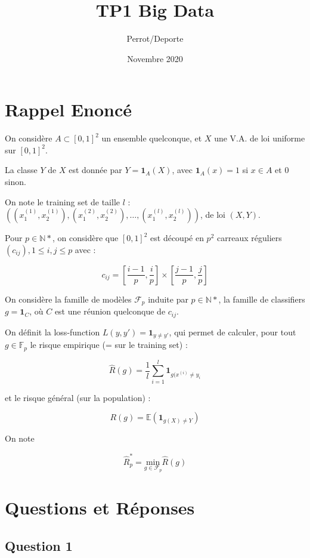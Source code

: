 \documentclass[french]{article}
\title{TP1 Big Data}
\author{Perrot/Deporte}
\date{Novembre 2020}
\begin{document}
\maketitle

\section{Rappel Enoncé}

On considère $A \subset [0,1]^{2}$ un ensemble quelconque, et $X$ une V.A. de loi uniforme sur $[0,1]^{2}$.

La classe $Y$ de $X$ est donnée par $Y = \mathbf{1}_{A}(X)$, avec $\mathbf{1}_{A}(x) = 1 $ si $ x \in A $ et 0 sinon.

On note le training set de taille $l$ : $((x_{1}^{(1)},x_{2}^{(1)}),(x_{1}^{(2)},x_{2}^{(2)}),\hdots,(x_{1}^{(l)},x_{2}^{(l)}))$, de loi $(X,Y)$.

Pour $p \in \mathbb{N}*$, on considère que $[0,1]^{2}$ est découpé en $p^{2}$ carreaux réguliers $(c_{ij}),1\leq i,j \leq p $ avec :

\[
c_{ij}=\left[ \frac{i-1}{p},\frac{i}{p} \right] \times 
\left[ \frac{j-1}{p},\frac{j}{p} \right]
\]

On considère la famille de modèles $\mathcal{F}_{p}$ induite par $p \in \mathbb{N}*$, la famille de classifiers $g = \mathbf{1}_{C}$, où $C$ est une réunion quelconque de $c_{ij}$.

On définit la loss-function $L(y,y') = \mathbf{1}_{y \neq y'}$, qui permet de calculer, pour tout $g \in \mathbb{F}_{p}$ le risque empirique (= sur le training set) :

\[
\hat{R}(g) = \frac{1}{l}\sum_{i=1}^{l}\mathbf{1}_{g(x^{(i)}\neq y_{i}}
\]

et le risque général (sur la population) :

\[
R(g) = \mathbb{E}(\mathbf{1}_{g(X)\neq Y})
\]

On note 

\[
\hat{R}^{*}_{p} = \underset{g \in \mathcal{F}_{p}}{\mathrm{min}} \hat{R}(g)
\]



\section{Questions et Réponses}

\subsection{Question 1}
\end{document}
